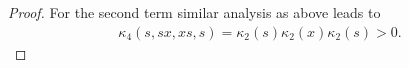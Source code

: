 \documentclass[10pt,a4paper]{amsart}
\begin{document}
\begin{proof}
For the second term similar analysis as above leads to
\begin{align*}
	\kappa_4(s,sx,xs,s)=\kappa_2(s)\kappa_2(x)\kappa_2(s)>0.
\end{align*} 
%
%

\end{proof}
\end{document}
